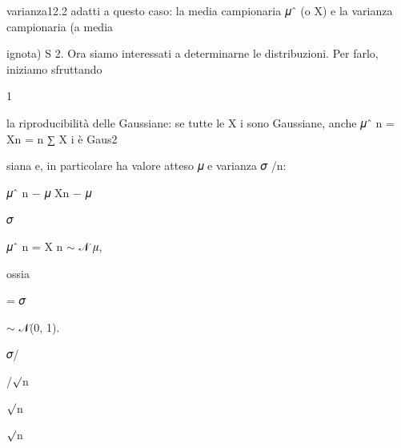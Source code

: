 \documentclass[a4paper,portrait,12pt]{article}
\begin{document}
\begin{flushleft}
varianza12.2 adatti a questo caso: la media campionaria 𝜇ˆ (o X) e la varianza campionaria (a media
\end{flushleft}


\begin{flushleft}
ignota) S 2. Ora siamo interessati a determinarne le distribuzioni. Per farlo, iniziamo sfruttando
\end{flushleft}


1


\begin{flushleft}
la riproducibilit\`{a} delle Gaussiane: se tutte le X i sono Gaussiane, anche 𝜇ˆ n = Xn = n ∑ X i \`{e} Gaus2
\end{flushleft}


\begin{flushleft}
siana e, in particolare ha valore atteso 𝜇 e varianza 𝜎 /n:
\end{flushleft}


\begin{flushleft}
𝜇ˆ n $-$ 𝜇 Xn $-$ 𝜇
\end{flushleft}


\begin{flushleft}
𝜎
\end{flushleft}


\begin{flushleft}
𝜇ˆ n = X n $\sim$ 𝒩 𝜇,
\end{flushleft}


\begin{flushleft}
ossia
\end{flushleft}


\begin{flushleft}
= 𝜎
\end{flushleft}


\begin{flushleft}
$\sim$ 𝒩(0, 1).
\end{flushleft}


\begin{flushleft}
𝜎/
\end{flushleft}


\begin{flushleft}
/$\surd$n
\end{flushleft}


\begin{flushleft}
$\surd$n
\end{flushleft}


\begin{flushleft}
$\surd$n
\end{flushleft}
\end{document}
